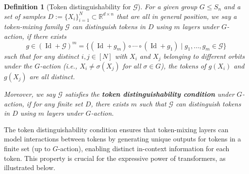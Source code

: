 \documentclass{article}
\newtheorem{definition}{Definition}
\begin{document}
\begin{definition}[Token distinguishability for $\mathcal G$]
    \label{def:token_distinguishability}
    For a given group $G\le S_n$ and a set of samples $D:=\{X_i\}_{i=1}^N\subset \mathbb{R}^{d\times n}$ that are all in general position, we say a token-mixing family $\mathcal G$ can distinguish tokens in $D$ using $m$ layers under $G$-action, if there exists
    \begin{equation}
        g \in (\operatorname{Id}+\mathcal{G})^m = \{(\operatorname{Id}+g_m)\circ\cdots \circ (\operatorname{Id}+g_1) \mid g_1,\dots, g_m\in \mathcal{G} \}
     \end{equation}
     such that for any distinct $i,j\in[N]$ with $X_i$ and $X_j$ belonging to different orbits under the $G$-action (i.e., $X_i\neq \sigma(X_j)$ for all $\sigma\in G$), the tokens of $g(X_i)$ and $g(X_j)$ are all distinct.

     Moreover, we say $\mathcal G$ satisfies the \textbf{token distinguishability condition} under $G$-action, if for any finite set $D$, there exists $m$ such that $\mathcal G$ can distinguish tokens in $D$ using $m$ layers under $G$-action.

\end{definition}

The token distinguishability condition ensures that token-mixing layers can model interactions between tokens by generating unique outputs for tokens in a finite set (up to $G$-action), enabling distinct in-context information for each token. This property is crucial for the expressive power of transformers, as illustrated below.
\end{document}
